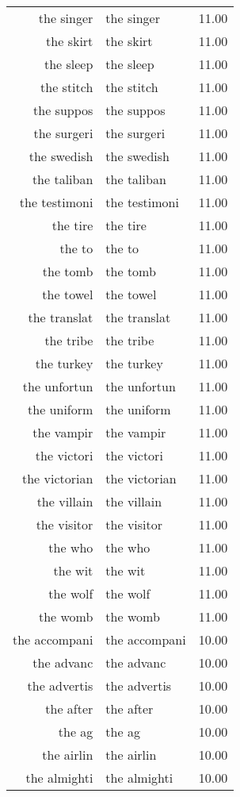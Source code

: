 \begin{table}[ht]
\begin{tabular}{rlr}
  the singer & the singer & 11.00 \\ 
  the skirt & the skirt & 11.00 \\ 
  the sleep & the sleep & 11.00 \\ 
  the stitch & the stitch & 11.00 \\ 
  the suppos & the suppos & 11.00 \\ 
  the surgeri & the surgeri & 11.00 \\ 
  the swedish & the swedish & 11.00 \\ 
  the taliban & the taliban & 11.00 \\ 
  the testimoni & the testimoni & 11.00 \\ 
  the tire & the tire & 11.00 \\ 
  the to & the to & 11.00 \\ 
  the tomb & the tomb & 11.00 \\ 
  the towel & the towel & 11.00 \\ 
  the translat & the translat & 11.00 \\ 
  the tribe & the tribe & 11.00 \\ 
  the turkey & the turkey & 11.00 \\ 
  the unfortun & the unfortun & 11.00 \\ 
  the uniform & the uniform & 11.00 \\ 
  the vampir & the vampir & 11.00 \\ 
  the victori & the victori & 11.00 \\ 
  the victorian & the victorian & 11.00 \\ 
  the villain & the villain & 11.00 \\ 
  the visitor & the visitor & 11.00 \\ 
  the who & the who & 11.00 \\ 
  the wit & the wit & 11.00 \\ 
  the wolf & the wolf & 11.00 \\ 
  the womb & the womb & 11.00 \\ 
  the accompani & the accompani & 10.00 \\ 
  the advanc & the advanc & 10.00 \\ 
  the advertis & the advertis & 10.00 \\ 
  the after & the after & 10.00 \\ 
  the ag & the ag & 10.00 \\ 
  the airlin & the airlin & 10.00 \\ 
  the almighti & the almighti & 10.00 \\ 

\end{tabular}
\end{table}
